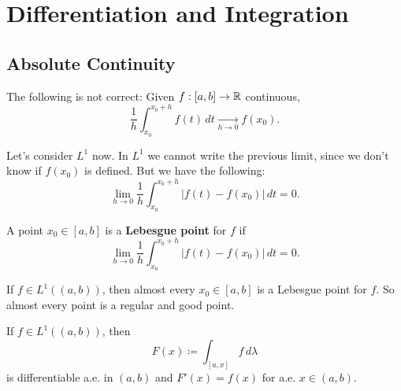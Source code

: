 \section{Differentiation and Integration}
\subsection{Absolute Continuity}

\begin{remark}
The following is not correct: Given $f:[a,b] \to \mathbb{R}$ continuous,
\[
\frac{1}{h} \int_{x_0}^{x_0+h} f(t) \, dt \xrightarrow[h \to 0]{} f(x_0).
\]
\end{remark}

Let's consider $L^1$ now. In $L^1$ we cannot write the previous limit, since we don't know if $f(x_0)$ is defined. But we have the following:
\[
\lim_{h \to 0} \frac{1}{h} \int_{x_0}^{x_0+h} |f(t) - f(x_0)| \, dt = 0.
\]

\begin{definition}
A point $x_0 \in [a,b]$ is a \textbf{Lebesgue point} for $f$ if
\[
\lim_{h \to 0} \frac{1}{h} \int_{x_0}^{x_0+h} |f(t) - f(x_0)| \, dt = 0.
\]
\end{definition}

\begin{theorem}
If $f \in L^1((a,b))$, then almost every $x_0 \in [a,b]$ is a Lebesgue point for $f$. So almost every point is a regular and good point.
\end{theorem}

\clearpage
\begin{theorem}
If $f \in L^1((a,b))$, then
\[
F(x) \coloneqq \int_{[a,x]} f \, d\lambda
\]
is differentiable a.e. in $(a,b)$ and $F'(x) = f(x)$ for a.e. $x \in (a,b)$.
\end{theorem}

